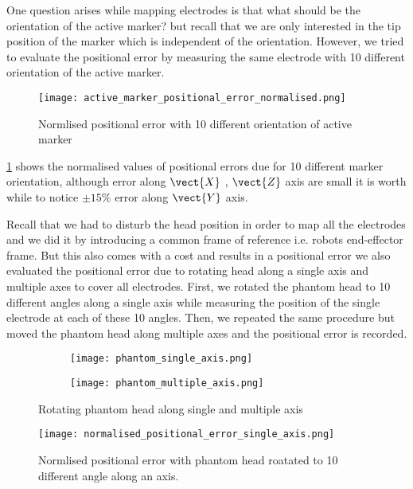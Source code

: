 One question arises while mapping electrodes is that what should be the orientation of the active marker? but recall that we are only interested in the tip position of the marker which is independent of the orientation. However, we tried to evaluate the positional error by measuring the same electrode with 10 different orientation of the active marker. 

\begin{figure}[hbt!]
	\centering
	\texttt{[image: active\_marker\_positional\_error\_normalised.png]}
	\caption{Normlised positional error with 10 different orientation of active marker} 
	\label{fig:active_marker_normalised_positional_error}
\end{figure}


\cref{fig:active_marker_normalised_positional_error} shows the normalised values of positional errors due for 10 different marker orientation, although error along $\vect{X}$ , $\vect{Z}$ axis are small it is worth while to notice $\pm15\%$ error along $\vect{Y}$ axis.


Recall that we had to disturb the head position in order to map all the electrodes and we did it by introducing a common frame of reference i.e. robots end-effector frame. But this also comes with a cost and results in a positional error we also evaluated the positional error due to rotating head along a single axis and multiple axes to cover all electrodes. First, we rotated the phantom head to 10 different angles along a single axis while measuring the position of the single electrode at each of these 10 angles. Then, we repeated the same procedure but moved the phantom head along multiple axes and the positional error is recorded. 

\begin{figure}[hbt!]
	\centering
	\begin{subfigure}{0.49\textwidth}
		\texttt{[image: phantom\_single\_axis.png]}	
	\end{subfigure}
	\hfill
	\begin{subfigure}{0.49\textwidth}
		\texttt{[image: phantom\_multiple\_axis.png]}	
	\end{subfigure}
	\caption{Rotating phantom head along single and multiple axis} 
	\label{fig:phantom_multiple_axis}
\end{figure} 

\begin{figure}[hbt!]
	\centering
	\texttt{[image: normalised\_positional\_error\_single\_axis.png]}
	\caption{Normlised positional error with phantom head roatated to 10 different angle along an axis.} 
	\label{fig:Normalised_positional_error_single_axis}
\end{figure}

